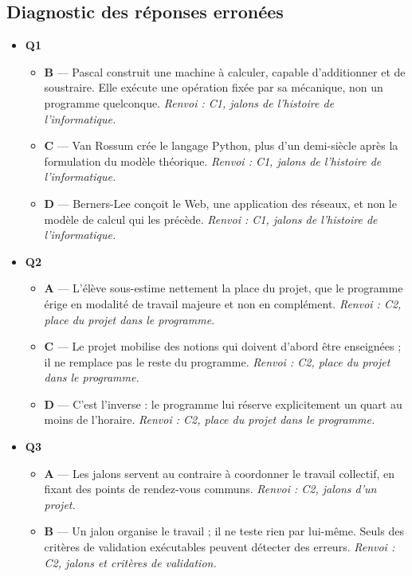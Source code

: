 \subsection*{Diagnostic des réponses erronées}

\begin{itemize}
  \item \textbf{Q1}
  \begin{itemize}
    \item \textbf{B} — Pascal construit une machine à calculer, capable d'additionner et de soustraire. Elle exécute une opération fixée par sa mécanique, non un programme quelconque. \emph{Renvoi : C1, jalons de l'histoire de l'informatique.}
    \item \textbf{C} — Van Rossum crée le langage Python, plus d'un demi-siècle après la formulation du modèle théorique. \emph{Renvoi : C1, jalons de l'histoire de l'informatique.}
    \item \textbf{D} — Berners-Lee conçoit le Web, une application des réseaux, et non le modèle de calcul qui les précède. \emph{Renvoi : C1, jalons de l'histoire de l'informatique.}
  \end{itemize}
  \item \textbf{Q2}
  \begin{itemize}
    \item \textbf{A} — L'élève sous-estime nettement la place du projet, que le programme érige en modalité de travail majeure et non en complément. \emph{Renvoi : C2, place du projet dans le programme.}
    \item \textbf{C} — Le projet mobilise des notions qui doivent d'abord être enseignées ; il ne remplace pas le reste du programme. \emph{Renvoi : C2, place du projet dans le programme.}
    \item \textbf{D} — C'est l'inverse : le programme lui réserve explicitement un quart au moins de l'horaire. \emph{Renvoi : C2, place du projet dans le programme.}
  \end{itemize}
  \item \textbf{Q3}
  \begin{itemize}
    \item \textbf{A} — Les jalons servent au contraire à coordonner le travail collectif, en fixant des points de rendez-vous communs. \emph{Renvoi : C2, jalons d'un projet.}
    \item \textbf{B} — Un jalon organise le travail ; il ne teste rien par lui-même. Seuls des critères de validation exécutables peuvent détecter des erreurs. \emph{Renvoi : C2, jalons et critères de validation.}

\end{itemize}
\end{itemize}
